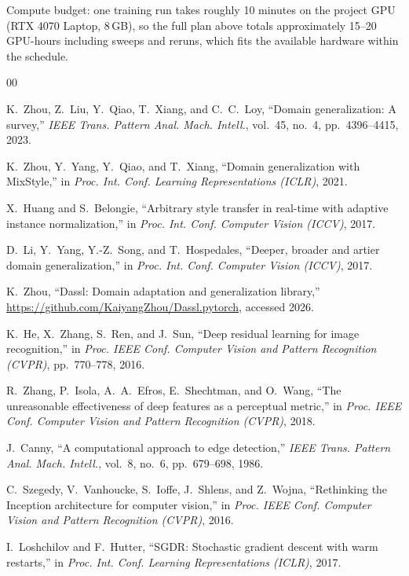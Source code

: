 Compute budget: one training run takes roughly 10 minutes on the project GPU (RTX 4070 Laptop, 8\,GB), so the full plan above totals approximately 15--20 GPU-hours including sweeps and reruns, which fits the available hardware within the schedule.





\begin{thebibliography}{00}

K.~Zhou, Z.~Liu, Y.~Qiao, T.~Xiang, and C.~C.~Loy,
``Domain generalization: A survey,''
\textit{IEEE Trans. Pattern Anal. Mach. Intell.}, vol.~45, no.~4, pp.~4396--4415, 2023.

K.~Zhou, Y.~Yang, Y.~Qiao, and T.~Xiang,
``Domain generalization with MixStyle,''
in \textit{Proc. Int. Conf. Learning Representations (ICLR)}, 2021.

X.~Huang and S.~Belongie,
``Arbitrary style transfer in real-time with adaptive instance normalization,''
in \textit{Proc. Int. Conf. Computer Vision (ICCV)}, 2017.

D.~Li, Y.~Yang, Y.-Z.~Song, and T.~Hospedales,
``Deeper, broader and artier domain generalization,''
in \textit{Proc. Int. Conf. Computer Vision (ICCV)}, 2017.

K.~Zhou, ``Dassl: Domain adaptation and generalization library,''
\url{https://github.com/KaiyangZhou/Dassl.pytorch}, accessed 2026.

K.~He, X.~Zhang, S.~Ren, and J.~Sun,
``Deep residual learning for image recognition,''
in \textit{Proc. IEEE Conf. Computer Vision and Pattern Recognition (CVPR)}, pp.~770--778, 2016.

R.~Zhang, P.~Isola, A.~A.~Efros, E.~Shechtman, and O.~Wang,
``The unreasonable effectiveness of deep features as a perceptual metric,''
in \textit{Proc. IEEE Conf. Computer Vision and Pattern Recognition (CVPR)}, 2018.

J.~Canny,
``A computational approach to edge detection,''
\textit{IEEE Trans. Pattern Anal. Mach. Intell.}, vol.~8, no.~6, pp.~679--698, 1986.

C.~Szegedy, V.~Vanhoucke, S.~Ioffe, J.~Shlens, and Z.~Wojna,
``Rethinking the Inception architecture for computer vision,''
in \textit{Proc. IEEE Conf. Computer Vision and Pattern Recognition (CVPR)}, 2016.

I.~Loshchilov and F.~Hutter,
``{SGDR}: Stochastic gradient descent with warm restarts,''
in \textit{Proc. Int. Conf. Learning Representations (ICLR)}, 2017.

\end{thebibliography}


